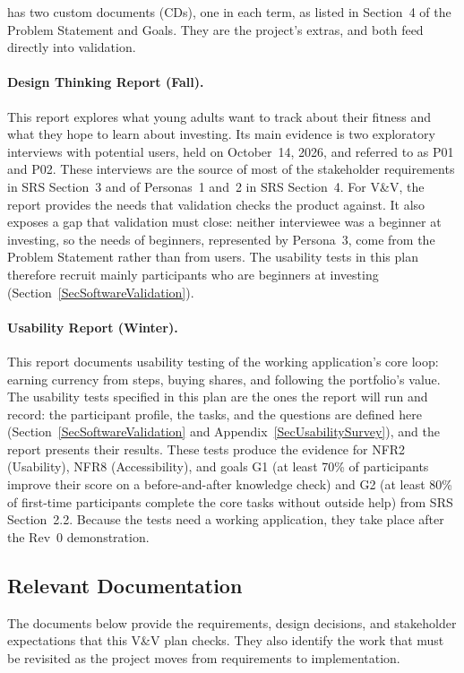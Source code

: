 \documentclass[12pt, titlepage]{article}
\begin{document}
\progname{} has two custom documents (CDs), one in each term, as listed in
Section~4 of the Problem Statement and Goals. They are the project's extras,
and both feed directly into validation.

\paragraph{Design Thinking Report (Fall).} This report explores what young
adults want to track about their fitness and what they hope to learn about
investing. Its main evidence is two exploratory interviews with potential
users, held on October~14, 2026, and referred to as P01 and P02. These
interviews are the source of most of the stakeholder requirements in SRS
Section~3 and of Personas~1 and~2 in SRS Section~4. For V\&V, the report
provides the needs that validation checks the product against. It also
exposes a gap that validation must close: neither interviewee was a beginner
at investing, so the needs of beginners, represented by Persona~3, come from
the Problem Statement rather than from users. The usability tests in this plan
therefore recruit mainly participants who are beginners at investing
(Section~\ref{SecSoftwareValidation}).

\paragraph{Usability Report (Winter).} This report documents usability
testing of the working application's core loop: earning currency from steps,
buying shares, and following the portfolio's value. The usability tests
specified in this plan are the ones the report will run and record: the
participant profile, the tasks, and the questions are defined here
(Section~\ref{SecSoftwareValidation} and Appendix~\ref{SecUsabilitySurvey}),
and the report presents their results. These tests produce the evidence for
NFR2 (Usability), NFR8 (Accessibility), and goals G1 (at least 70\% of
participants improve their score on a before-and-after knowledge check) and
G2 (at least 80\% of first-time participants complete the core tasks without
outside help) from SRS Section~2.2. Because the tests need a working
application, they take place after the Rev~0 demonstration.

\subsection{Relevant Documentation}

The documents below provide the requirements, design decisions, and stakeholder expectations that this V\&V plan checks. They also identify the work that must be revisited as the project moves from requirements to implementation.
\end{document}
